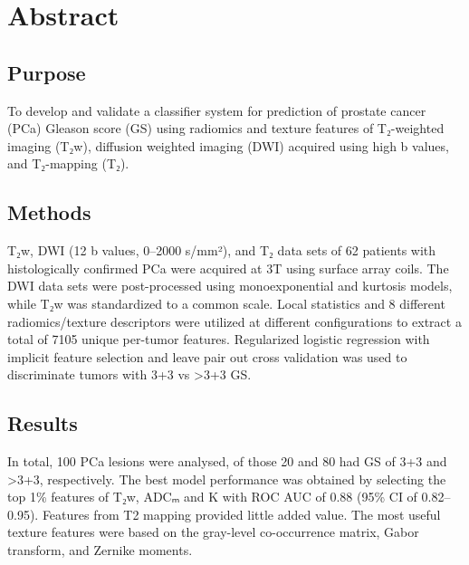 \documentclass[10pt,letterpaper]{article}
\begin{document}
\section*{Abstract}
%

\subsection*{Purpose}

To develop and validate a classifier system for prediction of prostate cancer
(PCa) Gleason score (GS) using radiomics and texture features of T₂-weighted
imaging (T₂w), diffusion weighted imaging (DWI) acquired using high b values,
and T₂-mapping (T₂).


\subsection*{Methods}

T₂w, DWI (12 b values, 0--2000 s/mm²), and T₂ data sets of 62 patients with
histologically confirmed PCa were acquired at 3T using surface array coils. The
DWI data sets were post-processed using monoexponential and kurtosis models,
while T₂w was standardized to a common scale. Local statistics and 8 different
radiomics/texture descriptors were utilized at different configurations to
extract a total of 7105 unique per-tumor features. Regularized logistic
regression with implicit feature selection and leave pair out cross validation
was used to discriminate tumors with 3+3 vs >3+3 GS\@.


\subsection*{Results}

In total, 100 PCa lesions were analysed, of those 20 and 80 had GS of 3+3 and
>3+3, respectively. The best model performance was obtained by selecting the top
1\% features of T₂w, ADCₘ and K with ROC AUC of 0.88 (95\% CI of 0.82--0.95).
Features from T2 mapping provided little added value. The most useful texture
features were based on the gray-level co-occurrence matrix, Gabor transform, and
Zernike moments.
\end{document}

